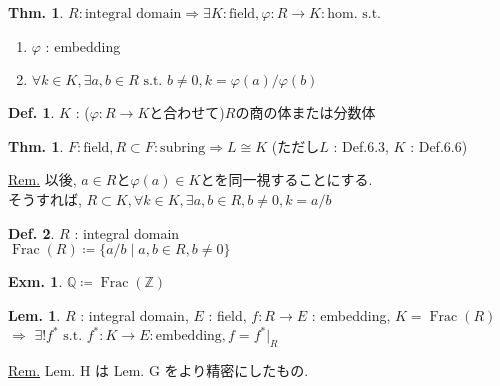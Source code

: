 \documentclass[uplatex,dvipdfmx,9pt]{beamer}
\newcommand{\st}{\text{ s.t. }}
\newcommand{\Frac}[1]{\operatorname{Frac}(#1)}
\renewcommand{\hom}{\text{hom.}} %
\newcommand{\Z}{\mathbb{Z}}
\newcommand{\Q}{\mathbb{Q}}
\newcounter{textThmCount}
\newcounter{textLemCount}
\theoremstyle{definition} %
\newtheorem{defn}{Def.}[subsection] %
\newtheorem{thm}{Thm.}[subsection] %
\newtheorem{thmText}[textThmCount]{Thm.}
\newtheorem{lemText}[textLemCount]{Lem.} %
\theoremstyle{example}
\newtheorem{exm}{Exm.}[subsection]
\begin{document}
    \begin{frame}

      \begin{thmText}
        $R : \text{integral domain} \Rightarrow \exists K : \text{field}, \varphi\colon R \to K : \hom \st$
        \begin{enumerate}
          \item $\varphi$ : embedding
          \item $\forall k \in K, \exists a, b \in R \st b \neq 0, k = \varphi(a) / \varphi(b)$
        \end{enumerate}
      \end{thmText}

      \begin{defn}
        $K$ : ($\varphi\colon R \to K$と合わせて)$R$の\alert{商の体}または\alert{分数体}
      \end{defn}

      \begin{thm}
        $F : \text{field}, R \subset F : \text{subring} \Rightarrow L \cong K$ (ただし$L$ : Def.6.3, $K$ : Def.6.6)
      \end{thm}
      \underline{Rem.} 以後, $a \in R$と$\varphi(a) \in K$とを同一視することにする. \\
      そうすれば, $R \subset K, \forall k \in K, \exists a, b \in R, b \neq 0, k = a/b$

   \end{frame}

    \begin{frame}

      \begin{defn}
        $R$ : integral domain \\
        $\Frac{R} \coloneqq \{a/b \mid a, b \in R, b \neq 0\}$
      \end{defn}

      \begin{exm}
        $\Q \coloneqq \Frac{\Z}$
      \end{exm}
 
      \begin{lemText}
        $R$ : integral domain, $E$ : field, $f\colon R \to E$ : embedding, $K = \Frac{R}$ \\
        $\Rightarrow$ $\exists! f^* \st f^*\colon K \to E : \text{embedding}, f = f^*\vert_R$
      \end{lemText}
      \underline{Rem.} Lem. H は Lem. G をより精密にしたもの.
      
    \end{frame}
\end{document}
